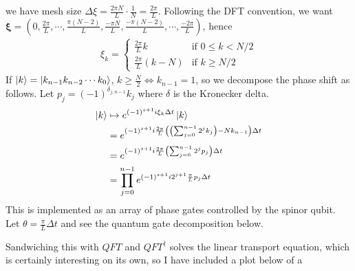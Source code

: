 \documentclass[10pt]{article}
\begin{document}
we have mesh size $\Delta \xi = \frac{2 \pi N}{L} \cdot \frac{1}{N} = \frac{2 \pi}{L}$. Following
the DFT convention, we want $\mathbf{\xi} = \left(0, \frac{2\pi}{L}, \cdots, \frac{\pi(N-2)}{L},
\frac{-\pi N}{L}, \frac{-\pi (N-2)}{L}, \cdots, \frac{-2\pi}{L} \right)$, hence
\begin{align*}
    \xi_k = 
    \begin{cases}
        \frac{2\pi}{L}k & \text{if $0 \leq k < N/2$} \\
        \frac{2\pi}{L}(k - N) & \text{if $k \geq N/2$}
    \end{cases}
\end{align*}    
If $\ket{k} = \ket{k_{n-1} k_{n-2} \cdots k_0}$, $k \geq \frac{N}{2} \iff k_{n-1} = 1$, so
we decompose the phase shift as follows. Let $p_j = (-1)^{\delta_{j,n-1}} k_j$ where $\delta$ is
the Kronecker delta.
\begin{align*}
    \ket{k} &\mapsto e^{(-1)^{s+1}i \xi_k \Delta t} \ket{k} \\
    &=  e^{(-1)^{s+1} i \frac{2\pi}{L}\left(\left(\sum_{j=0}^{n-1} 2^j k_j\right) - N k_{n-1} \right) \Delta t} \\
    &= e^{(-1)^{s+1} i \frac{2\pi}{L}\left(\sum_{j=0}^{n-1}2^j p_j \right) \Delta t} \\
    &= \prod_{j=0}^{n-1} e^{(-1)^{s+1} i 2^{j+1}\frac{\pi}{L} p_j \Delta t}
\end{align*}
This is implemented as an array of phase gates controlled by the spinor qubit. Let $\theta =
\frac{\pi}{L} \Delta t$ and see the quantum gate decomposition below.
\begin{center}
\end{center}
Sandwiching this with $QFT$ and $QFT^\dag$ solves the linear transport equation,
which is certainly interesting on its own, so I have included a plot below of a
\end{document}
